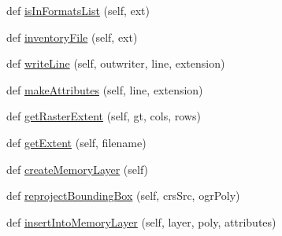 \begin{DoxyCompactItemize}
\item 
def \mbox{\hyperlink{class_dsg_tools_1_1_factories_1_1_thread_factory_1_1inventory_thread_1_1_inventory_thread_a2b836f05fa0564687851b4c400121a81}{is\+In\+Formats\+List}} (self, ext)
\item 
def \mbox{\hyperlink{class_dsg_tools_1_1_factories_1_1_thread_factory_1_1inventory_thread_1_1_inventory_thread_a63d540736abafb654e777518aeebec6d}{inventory\+File}} (self, ext)
\item 
def \mbox{\hyperlink{class_dsg_tools_1_1_factories_1_1_thread_factory_1_1inventory_thread_1_1_inventory_thread_af9397bb34d4df98d8074f960296fd412}{write\+Line}} (self, outwriter, line, extension)
\item 
def \mbox{\hyperlink{class_dsg_tools_1_1_factories_1_1_thread_factory_1_1inventory_thread_1_1_inventory_thread_ab72bc1372d558d3938a4ee94ff245c0a}{make\+Attributes}} (self, line, extension)
\item 
def \mbox{\hyperlink{class_dsg_tools_1_1_factories_1_1_thread_factory_1_1inventory_thread_1_1_inventory_thread_a6fa65de4be1523486c67c51a95b0bd8c}{get\+Raster\+Extent}} (self, gt, cols, rows)
\item 
def \mbox{\hyperlink{class_dsg_tools_1_1_factories_1_1_thread_factory_1_1inventory_thread_1_1_inventory_thread_a9b4252c1a4521ad460bd13842fe02483}{get\+Extent}} (self, filename)
\item 
def \mbox{\hyperlink{class_dsg_tools_1_1_factories_1_1_thread_factory_1_1inventory_thread_1_1_inventory_thread_ab791655b05235f3a4f0c57708d057371}{create\+Memory\+Layer}} (self)
\item 
def \mbox{\hyperlink{class_dsg_tools_1_1_factories_1_1_thread_factory_1_1inventory_thread_1_1_inventory_thread_a854b1e38ffd3073ea2343a4f8869cac9}{reproject\+Bounding\+Box}} (self, crs\+Src, ogr\+Poly)
\item 
def \mbox{\hyperlink{class_dsg_tools_1_1_factories_1_1_thread_factory_1_1inventory_thread_1_1_inventory_thread_a9e240e481365cbe1a7de2450655503e3}{insert\+Into\+Memory\+Layer}} (self, layer, poly, attributes)
\end{DoxyCompactItemize}
